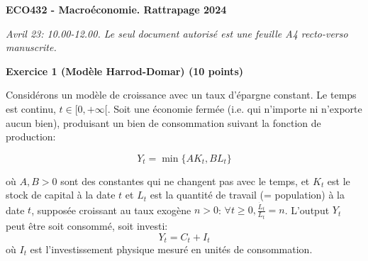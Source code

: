 \documentclass{article}
\begin{document}
\begin{center}
    \textbf{ECO432 - Macroéconomie. Rattrapage   2024}



\end{center}

\begin{center}

\textit{Avril 23: 10.00-12.00. Le seul document autorisé est une feuille A4 recto-verso manuscrite.}

\end{center}
\bigskip
\bigskip

\textbf{Exercice 1 (Modèle Harrod-Domar)  (10 points)}


\textbf{}

\hspace{1.0in}


Considérons un modèle de croissance avec un taux d'épargne constant. Le temps est continu, $t \in [0, +\infty[$. Soit une économie fermée (i.e. qui n’importe ni n’exporte aucun bien), produisant un bien de consommation suivant la fonction de production:

\begin{equation}\label{leon}
Y_t=\min\{ AK_t,BL_t\}
\end{equation}

où $A, B > 0$ sont des constantes qui ne changent pas avec le temps, et \( K_t \) est le stock de capital à la date \( t \) et \( L_t \) est la quantité de travail (= population) à la date \( t \), supposée croissant au taux exogène \( n > 0 \): \( \forall t \geq 0, \frac{\dot{L}_t}{L_t} = n \). L'output $Y_t$ peut être soit consommé, soit investi:
\begin{equation}Y_t=C_t+I_t \end{equation} où $I_t$ est l'investissement physique mesuré en unités de consommation. 


\end{document}
